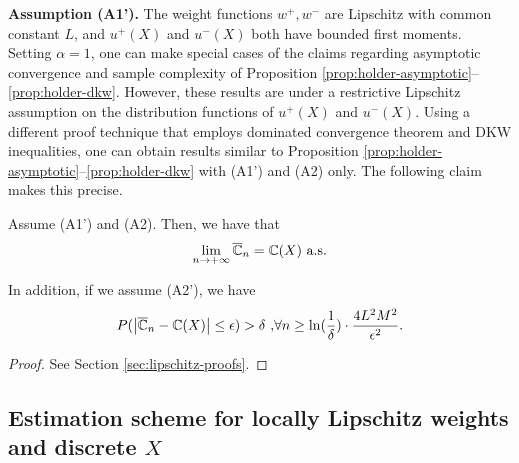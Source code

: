 \textbf{Assumption (A1').}  The weight functions $w^+, w^-$ are Lipschitz with common constant $L$, and 
$u^+(X)$ and $u^-(X)$ both have bounded first moments.\\[1ex]

Setting $\alpha=1$, one can make special cases of the claims regarding asymptotic convergence and sample complexity of Proposition \ref{prop:holder-asymptotic}--\ref{prop:holder-dkw}. However, these results are under  a restrictive Lipschitz assumption on the distribution functions of $u^+(X)$ and $u^-(X)$. Using a different proof technique that employs dominated convergence theorem and DKW inequalities, one can obtain results similar to Proposition \ref{prop:holder-asymptotic}--\ref{prop:holder-dkw} with (A1') and (A2) only. The following claim makes this precise.

\begin{proposition}
\label{prop:lipschitz}
Assume (A1') and (A2). Then, we have that 
$$\lim_{n\rightarrow +\infty} \overline {\mathbb{C}}_n = \mathbb{C}(X) \text{   a.s.}$$

In addition, if we assume (A2'), we have 
$$
P(\left |\overline {\mathbb{C}}_n- \mathbb{C}(X) \right| \leq  \epsilon ) > \delta\text{     ,} \forall n \geq \ln(\frac{1}{\delta})\cdot 
\frac{4L^2 M^2}{\epsilon^{2}}.
$$
\end{proposition}
\begin{proof}
See Section \ref{sec:lipschitz-proofs}.
\end{proof}



\subsection{Estimation scheme for locally Lipschitz weights and discrete $X$}

